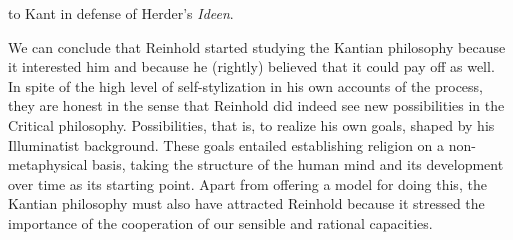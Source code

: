 to Kant in defense of Herder's \textit{Ideen}. 

 We can conclude that Reinhold started studying the Kantian philosophy because it interested him and because he (rightly) believed that it could pay off as well. In spite of the high level of self{-}stylization in his own accounts of the process, they are honest in the sense that Reinhold did indeed see new possibilities in the Critical philosophy. Possibilities, that is, to realize his own goals, shaped by his Illuminatist background. These goals entailed establishing religion on a non{-}metaphysical basis, taking the structure of the human mind and its development over time as its starting point. Apart from offering a model for doing this, the Kantian philosophy must also have attracted Reinhold because it stressed the importance of the cooperation of our sensible and rational capacities. 

